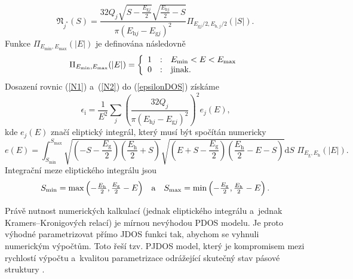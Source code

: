 \begin{equation}
\label{N2}
\mathfrak{N}_{j^*}(S) = 
\frac{
		32Q_j 
		\sqrt{S-\frac{E_{\mathrm{g}j}}{2}}
		\sqrt{\frac{E_{\mathrm{h}j}}{2}-S}
	}{
		\pi (E_{\mathrm{h}j} - E_{\mathrm{g}j})^2
	}
\Pi_{E_{\mathrm{g}j}/2,E_{\mathrm{h},j}/2}(|S|)
\text{.}
\end{equation}
Funkce $\Pi_{E_\mathrm{min},E_\mathrm{max}}(|E|)$ je definována následovně
\begin{equation}
\Pi_{E_\mathrm{min},E_\mathrm{max}}(|E|) = 
	\left\{\begin{array}{l c l} 
	1 & : & E_\mathrm{min} < E < E_\mathrm{max} \\
	0 & : & \text{jinak.} \end{array} \right.
\end{equation}
Dosazení rovnic (\ref{N1}) a~(\ref{N2}) do (\ref{epsilonDOS}) získáme
\begin{equation}
\epsilon_\mathrm{i} = \frac{1}{E^2} \sum_j \left(\frac{32Q_j}{\pi (E_{\mathrm{h}j} - E_{\mathrm{g}j})^2}\right)^2 e_j(E) \text{,}
\end{equation}
kde $e_j(E)$ značí eliptický integrál, který musí být spočítán numericky
\begin{equation}
e(E) = \int_{S_\mathrm{min}}^{S_\mathrm{max}}
\sqrt{\left(-S - \frac{E_\mathrm{g}}{2}\right)\left(\frac{E_\mathrm{h}}{2} + S\right)}
\sqrt{\left(E + S - \frac{E_\mathrm{g}}{2}\right)\left(\frac{E_\mathrm{h}}{2} -E - S\right)}
\mathrm{d}S\,\,\Pi_{E_{\mathrm{g}},E_{\mathrm{h}}}(|E|)\text{.}
\end{equation}
Integrační meze eliptického integrálu jsou 
\begin{equation}
\begin{array}{l c r}
S_\mathrm{min} = \max\left(-\frac{E_\mathrm{h}}{2}, \frac{E_\mathrm{g}}{2} -E\right) &
\text{a} &
S_\mathrm{max} = \min\left(-\frac{E_\mathrm{g}}{2}, \frac{E_\mathrm{h}}{2} -E\right) \text{.} \\
\end{array}
\end{equation}



Právě nutnost numerických kalkulací (jednak eliptického integrálu a~jednak Kramers--Kronigových relací) je mírnou nevýhodou PDOS modelu. Je proto výhodné parametrizovat přímo JDOS funkci tak, abychom se vyhnuli numerickým výpočtům. Toto řeší tzv. PJDOS model, který je kompromisem mezi rychlostí výpočtu a~kvalitou parametrizace odrážející skutečný stav pásové struktury \cite{Franta2007}. 

